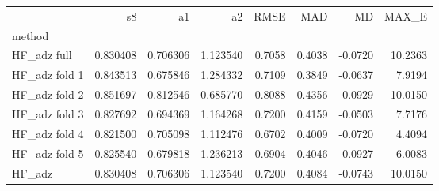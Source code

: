 \begin{tabular}{lrrrrrrr}
 & s8 & a1 & a2 & RMSE & MAD & MD & MAX_E \\
method &  &  &  &  &  &  &  \\
HF_adz full & 0.830408 & 0.706306 & 1.123540 & 0.7058 & 0.4038 & -0.0720 & 10.2363 \\
HF_adz fold 1 & 0.843513 & 0.675846 & 1.284332 & 0.7109 & 0.3849 & -0.0637 & 7.9194 \\
HF_adz fold 2 & 0.851697 & 0.812546 & 0.685770 & 0.8088 & 0.4356 & -0.0929 & 10.0150 \\
HF_adz fold 3 & 0.827692 & 0.694369 & 1.164268 & 0.7200 & 0.4159 & -0.0503 & 7.7176 \\
HF_adz fold 4 & 0.821500 & 0.705098 & 1.112476 & 0.6702 & 0.4009 & -0.0720 & 4.4094 \\
HF_adz fold 5 & 0.825540 & 0.679818 & 1.236213 & 0.6904 & 0.4046 & -0.0927 & 6.0083 \\
HF_adz & 0.830408 & 0.706306 & 1.123540 & 0.7200 & 0.4084 & -0.0743 & 10.0150 \\
\end{tabular}
